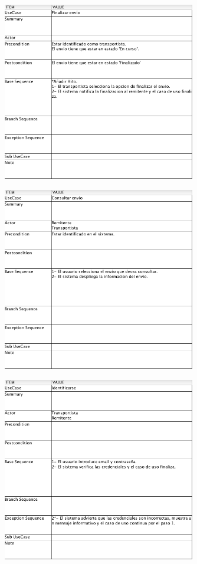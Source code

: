 \documentclass[10pt, a4paper,spanish]{article}
\begin{document}
		\begin{figure}[H]
			\centering
				\includegraphics[width=0.75\textwidth]{astah/use_case_finalizar_envio.png}
		\end{figure}

		\begin{figure}[H]
			\centering
				\includegraphics[width=0.75\textwidth]{astah/use_case_consultar_envio.png}
		\end{figure}

		\begin{figure}[H]
			\centering
				\includegraphics[width=0.75\textwidth]{astah/use_case_identificarse.png}
		\end{figure}
\end{document}
